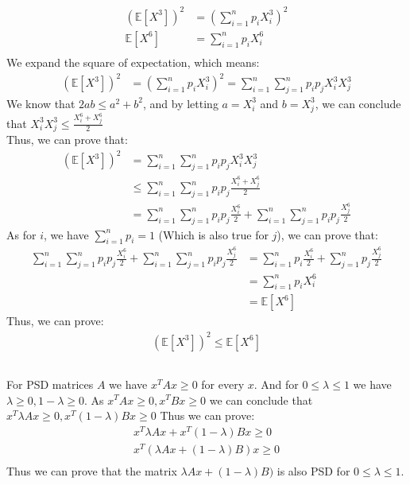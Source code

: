 \documentclass{article}
\begin{document}
\subsection{} %
\begin{align*}
    (\mathbb{E}[X^3])^2 &= (\sum_{i=1}^{n} p_iX_i^3)^2 \\
    \mathbb{E}[X^6] &= \sum_{i=1 }^{n} p_iX_i^6 \\
\end{align*}
We expand the square of expectation, which means:
\begin{align*}
    (\mathbb{E}[X^3])^2 &= (\sum_{i=1}^{n} p_iX_i^3)^2 =\sum_{i=1}^{n} \sum_{j=1 }^{n} p_ip_jX_i^3X_j^3
\end{align*}
We know that $ 2ab \leq a^2 + b^2 $, and by letting $ a = X_i^3 $ and $ b = X_j^3 $, we can conclude that $ X_i^3X_j^3\leq \frac{X_i^6 + X_j^6}{2} $ \\
Thus, we can prove that:
\begin{align*}
    (\mathbb{E}[X^3])^2 &= \sum_{i=1}^{n} \sum_{j=1 }^{n} p_ip_jX_i^3X_j^3 \\
                        &\leq \sum_{i=1}^{n} \sum_{j=1 }^{n} p_ip_j\frac{X_i^6 + X_j^6}{2} \\
                        &= \sum_{i=1}^{n} \sum_{j=1 }^{n} p_ip_j \frac{X_i^6}{2} + \sum_{i=1}^{n} \sum_{j=1 }^{n} p_ip_j \frac{X_j^6 }{2}
\end{align*}
As for $ i $, we have $ \sum_{i=1}^{n} p_i=1 $ (Which is also true for $ j $), we can prove that:
\begin{align*}
    \sum_{i=1}^{n} \sum_{j=1 }^{n} p_ip_j \frac{X_i^6}{2} + \sum_{i=1}^{n} \sum_{j=1 }^{n} p_ip_j \frac{X_j^6 }{2} &= \sum_{i=1}^{n} p_i \frac{X_i^6 }{2} + \sum_{j=1 }^{n} p_j \frac{X_j^6 }{2} \\
&= \sum_{i=1}^{n} p_iX_i^6 \\
&= \mathbb{E}[X^6]
\end{align*}
Thus, we can prove:
\begin{align*}
    (\mathbb{E}[X^3])^2 \leq \mathbb{E}[X^6]
\end{align*}
\subsection{} %
For PSD matrices $ A $ we have $ x^TAx\geq 0 $ for every $ x $. And for $ 0\leq \lambda \leq 1 $ we have $ \lambda \geq 0, 1- \lambda \geq 0 $. 
As $ x^TAx \geq 0, x^TBx \geq 0 $ we can conclude that $ x^T\lambda Ax\geq 0, x^T(1-\lambda)Bx\geq 0 $
Thus we can prove:
\begin{align*}
    x^T\lambda Ax + x^T(1-\lambda)Bx\geq 0 \\
    x^T(\lambda Ax + (1-\lambda)B)x\geq 0 \\
\end{align*}
Thus we can prove that the matrix $ \lambda Ax + (1-\lambda)B) $ is also PSD for $ 0 \leq \lambda \leq 1 $.
\clearpage
\end{document}
